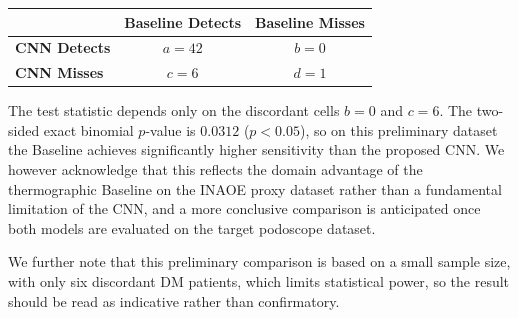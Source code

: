 \documentclass[12pt,a4paper]{article}
\newenvironment{response}{%
  \par\color{respblue}%
}{\par}
\begin{document}
\begin{response}
\begin{center}
\label{tab:mcnemar_prelim}
\vspace{0.6em}
\begin{tabular}{lcc}
\toprule
 & \textbf{Baseline Detects} & \textbf{Baseline Misses} \\
\midrule
\textbf{CNN Detects} & $a = 42$ & $b = 0$ \\
\textbf{CNN Misses}  & $c = 6$  & $d = 1$ \\
\bottomrule
\end{tabular}
\end{center}

The test statistic depends only on the discordant cells $b = 0$ and $c = 6$. The two-sided exact binomial $p$-value is $0.0312$ ($p < 0.05$), so on this preliminary dataset the Baseline achieves significantly higher sensitivity than the proposed CNN. We however acknowledge that this reflects the domain advantage of the thermographic Baseline on the INAOE proxy dataset rather than a fundamental limitation of the CNN, and a more conclusive comparison is anticipated once both models are evaluated on the target podoscope dataset.

We further note that this preliminary comparison is based on a small sample size, with only six discordant DM patients, which limits statistical power, so the result should be read as indicative rather than confirmatory.
\end{response}
\end{document}
